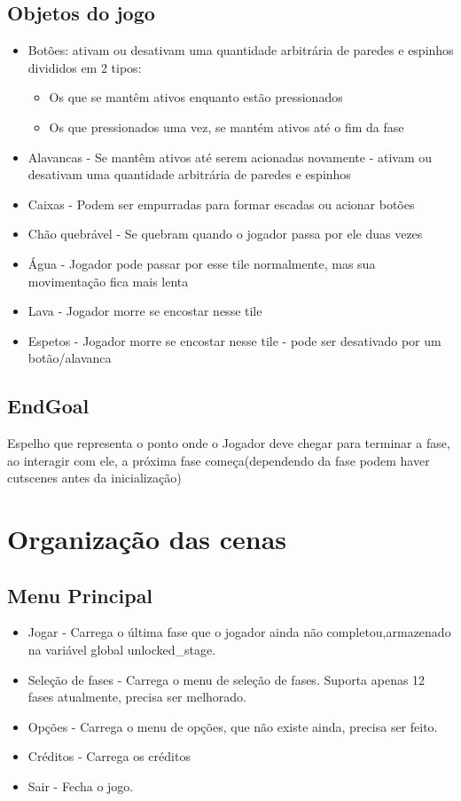 \documentclass[a4paper, 11pt]{article}
\begin{document}
	\subsection{Objetos do jogo} 
		\begin{itemize} 
			\item Botões: ativam ou desativam uma quantidade arbitrária de paredes e espinhos divididos em 2 tipos: \begin{itemize}
			        \item Os que se mantêm ativos enquanto estão pressionados
			        \item Os que pressionados uma vez, se mantém ativos até o fim da fase
			\end{itemize}   
			\item Alavancas - Se mantêm ativos até serem acionadas novamente - ativam ou desativam uma quantidade arbitrária de paredes e espinhos 
			\item Caixas - Podem ser empurradas para formar escadas ou acionar botões 
			\item Chão quebrável - Se quebram quando o jogador passa por ele duas vezes 
			\item Água - Jogador pode passar por esse tile normalmente, mas sua movimentação fica mais lenta 
			\item Lava - Jogador morre se encostar nesse tile 
			\item Espetos - Jogador morre se encostar nesse tile - pode ser desativado por um botão/alavanca 
		\end{itemize} 
 		\subsection{EndGoal}
 			Espelho que representa o ponto onde o Jogador deve chegar para terminar a fase, ao interagir com ele, a próxima fase começa(dependendo da fase podem haver cutscenes antes da inicialização)
	\section{Organização das cenas} 
		\subsection{Menu Principal} 
			\begin{itemize} 
				\item Jogar - Carrega o última fase que o jogador ainda não completou,armazenado na variável global unlocked\_stage. 
				\item Seleção de fases - Carrega o menu de seleção de fases. Suporta apenas 12 fases atualmente, precisa ser melhorado.
				\item Opções - Carrega o menu de opções, que não existe ainda, precisa ser feito. 
				\item Créditos - Carrega os créditos 
				\item Sair - Fecha o jogo.
			\end{itemize} 
 
\end{document}
